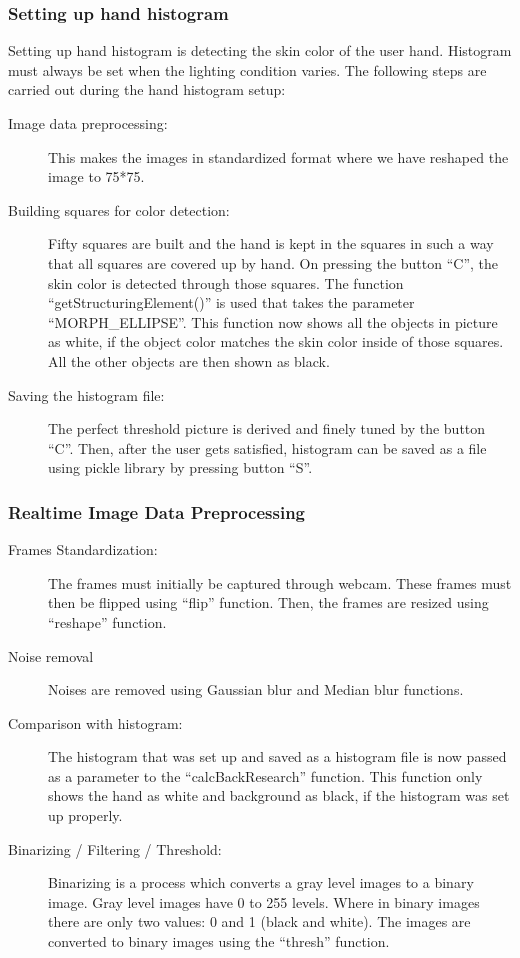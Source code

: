 \documentclass[fleqn, 11pt, twoside]{IOEGC}
\begin{document}
\subsubsection{Setting up hand histogram}
Setting up hand histogram is detecting the skin color of the user hand. Histogram must always be set when the lighting condition varies.  The following steps are carried out during the hand histogram setup:
\begin{description}
    \item[Image data preprocessing:]
    This makes the images in standardized format where we have reshaped the image to 75*75.
    
    \item[Building squares for color detection:] Fifty squares are built and the hand is kept in the squares in such a way that all squares are covered up by hand. On pressing the button “C”, the skin color is detected through those squares. The function “getStructuringElement()” is used that takes the parameter “MORPH\_ELLIPSE”. This function now shows all the objects in picture as white, if the object color matches the skin color inside of those squares. All the other objects are then shown as black.
    
    \item [Saving the histogram file:]
    The perfect threshold picture is derived and finely tuned by the button “C”. Then, after the user gets satisfied, histogram can be saved as a file using pickle library by pressing button “S”.
\end{description}
\subsubsection{Realtime Image Data Preprocessing}
\begin{description}
    \item[Frames Standardization: ]
    The frames must initially be captured through webcam. These frames must then be flipped using “flip” function. Then, the frames are resized using “reshape” function.    
    \item[Noise removal] Noises are removed using Gaussian blur and Median blur functions.
    \item[Comparison with histogram:] The histogram that was set up and saved as a histogram file is now passed as a parameter to the “calcBackResearch” function. This function only shows the hand as white and background as black, if the histogram was set up properly.
    \item[Binarizing / Filtering / Threshold: ]
    Binarizing is a process which converts a gray level images to a binary image. Gray level images have 0 to 255 levels. Where in binary images there are only two values: 0 and 1 (black and white). The images are converted to binary images using the “thresh” function.
    

\end{description}
    
\end{document}
